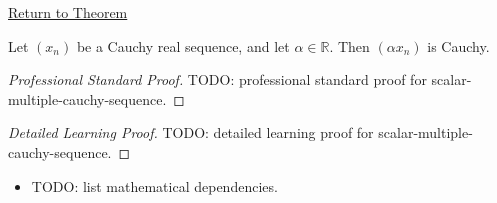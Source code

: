 \newpage
{}
\label{prf:scalar-multiple-cauchy-sequence}

\begin{remark*}[Return]
\hyperref[thm:scalar-multiple-cauchy-sequence]{Return to Theorem}
\end{remark*}

\begin{theorem*}
Let $(x_n)$ be a Cauchy real sequence, and let $\alpha\in\mathbb{R}$.
Then $(\alpha x_n)$ is Cauchy.

\smallskip
\noindent
\end{theorem*}

\begin{proof}[Professional Standard Proof]
\LRAProofBodyStart
TODO: professional standard proof for scalar-multiple-cauchy-sequence.
\end{proof}

\begin{proof}[Detailed Learning Proof]
\LRAProofBodyStart
TODO: detailed learning proof for scalar-multiple-cauchy-sequence.
\end{proof}

\begin{remark*}
\end{remark*}

\begin{dependencies}
\begin{itemize}
  \item TODO: list mathematical dependencies.
\end{itemize}
\end{dependencies}

\clearpage
